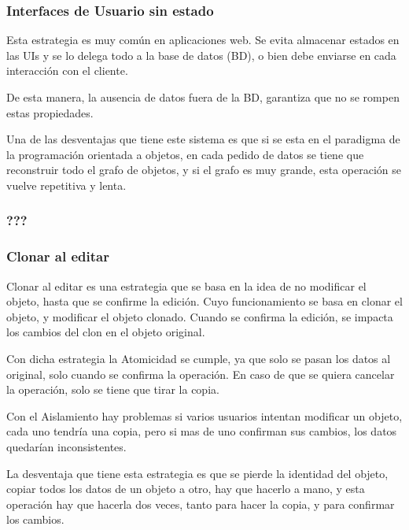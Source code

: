 	\subsubsection{Interfaces de Usuario sin estado}
		Esta estrategia es muy común en aplicaciones web. Se evita almacenar estados
		en las UIs y se lo delega todo a la base de datos (BD), o bien debe enviarse
		en cada interacción con el cliente.
		
		De esta manera, la	ausencia de datos fuera de la BD, garantiza que no se
		rompen estas propiedades.
		
		Una de las desventajas que tiene este sistema es que si se esta en el
		paradigma de la programación orientada a objetos, en cada pedido de datos
		se tiene que reconstruir todo el grafo de objetos, y si el grafo es muy grande,
		esta operación se vuelve repetitiva y lenta.
		
		
	\subsubsection{???}
	
	
	\subsubsection{Clonar al editar}
	
		Clonar al editar es una estrategia que se basa en la idea de no modificar el
		objeto, hasta que se confirme la edición. Cuyo funcionamiento se basa en 
		clonar el objeto, y modificar el objeto clonado. Cuando se confirma la
		edición, se impacta los cambios del clon en el objeto original.
		
		Con dicha estrategia la Atomicidad se cumple, ya que solo se pasan los datos
		al original, solo cuando se confirma la operación.
		En caso de que se quiera cancelar la operación, solo se tiene que tirar la
		copia.
		
		Con el Aislamiento hay problemas si varios usuarios intentan modificar un
		objeto, cada uno tendría una copia, pero si mas de uno confirman sus cambios,
		los datos quedarían inconsistentes.
		
		La desventaja que tiene esta estrategia es que se pierde la identidad del
		objeto, copiar todos los datos de un objeto a otro, hay que hacerlo a mano, y
		esta operación hay que hacerla dos veces, tanto para hacer la copia, y para
		confirmar los cambios.
